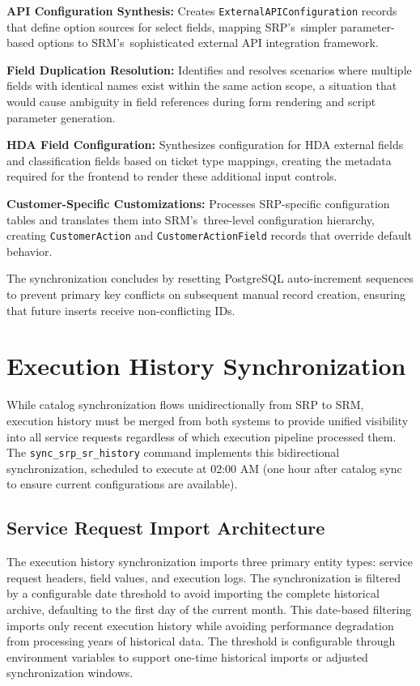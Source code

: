 \textbf{API Configuration Synthesis:} Creates \texttt{ExternalAPIConfiguration} records that define option sources for select fields, mapping SRP's~simpler parameter-based options to SRM's~sophisticated external API integration framework.

\textbf{Field Duplication Resolution:} Identifies and resolves scenarios where multiple fields with identical names exist within the same action scope, a situation that would cause ambiguity in field references during form rendering and script parameter generation.

\textbf{HDA Field Configuration:} Synthesizes configuration for HDA external fields and classification fields based on ticket type mappings, creating the metadata required for the frontend to render these additional input controls.

\textbf{Customer-Specific Customizations:} Processes SRP-specific configuration tables and translates them into SRM's~three-level configuration hierarchy, creating \texttt{CustomerAction} and \texttt{CustomerActionField} records that override default behavior.

The synchronization concludes by resetting PostgreSQL auto-increment sequences to prevent primary key conflicts on subsequent manual record creation, ensuring that future inserts receive non-conflicting IDs.

\section{Execution History Synchronization}

While catalog synchronization flows unidirectionally from SRP to SRM, execution history must be merged from both systems to provide unified visibility into all service requests regardless of which execution pipeline processed them. The \texttt{sync\_srp\_sr\_history} command implements this bidirectional synchronization, scheduled to execute at 02:00 AM (one hour after catalog sync to ensure current configurations are available).

\subsection{Service Request Import Architecture}

The execution history synchronization imports three primary entity types: service request headers, field values, and execution logs. The synchronization is filtered by a configurable date threshold to avoid importing the complete historical archive, defaulting to the first day of the current month. This date-based filtering imports only recent execution history while avoiding performance degradation from processing years of historical data. The threshold is configurable through environment variables to support one-time historical imports or adjusted synchronization windows.

